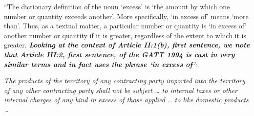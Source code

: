 \begin{displayquote}[][]
    \begin{center}
    \end{center}
  
    \begin{displayquote}[][]
    ``The dictionary definition of the noun `excess' is `the amount by which one number
        or quantity exceeds another'. More specifically, `in excess of' means `more than'. Thus,
        as a textual matter, a particular number or quantity is `in excess of' another number
        or quantity if it is greater, regardless of the extent to which it is greater. 
      \textbf{\textit{Looking at the context of Article II:1(b), first sentence, we note that Article III:2, first
      sentence, of the GATT 1994 is cast in very similar terms and in fact uses the phrase
      `in excess of'}}:\\
        \begin{displayquote}
        \textit{The products of the territory of any contracting party imported into the
      territory of any other contracting party shall not be subject … to internal
      taxes or other internal charges of any kind in excess of those applied … to
      like domestic products \ldots}
        \end{displayquote}   
    \end{displayquote}  
  \end{displayquote}

